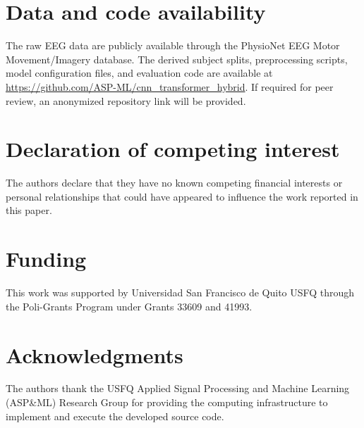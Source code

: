 \documentclass[a4paper,fleqn]{cas-dc}
\begin{document}
\section*{Data and code availability}
The raw EEG data are publicly available through the PhysioNet EEG Motor Movement/Imagery database. The derived subject splits, preprocessing scripts, model configuration files, and evaluation code are available at \url{https://github.com/ASP-ML/cnn_transformer_hybrid}. If required for peer review, an anonymized repository link will be provided.

\section*{Declaration of competing interest}
The authors declare that they have no known competing financial interests or personal relationships that could have appeared to influence the work reported in this paper.

\section*{Funding}
This work was supported by Universidad San Francisco de Quito USFQ through the Poli-Grants Program under Grants 33609 and 41993.


\section*{Acknowledgments}
The authors thank the USFQ Applied Signal Processing and Machine Learning (ASP\&ML) Research Group for providing the computing infrastructure to implement and execute the developed source code. 

\printcredits
\balance



\end{document}
